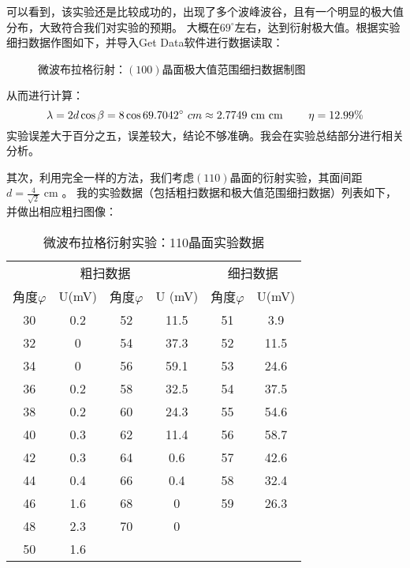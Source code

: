 \documentclass[11pt]{article}
\begin{document}
可以看到，该实验还是比较成功的，出现了多个波峰波谷，且有一个明显的极大值分布，大致符合我们对实验的预期。
大概在$69^{\circ}$左右，达到衍射极大值。根据实验细扫数据作图如下，并导入Get Data软件进行数据读取：

\begin{figure}[H]
    \centering
    \hspace{0.5cm}
    \caption{微波布拉格衍射：$(100)$晶面极大值范围细扫数据制图}
\end{figure}

从而进行计算：
\begin{displaymath}
    \lambda=2d\cos \beta=8\cos 69.7042^{\circ}\,\, cm \approx2.7749\,\, {\rm cm} \text{ cm }
\qquad \eta=12.99\%
\end{displaymath}
实验误差大于百分之五，误差较大，结论不够准确。我会在实验总结部分进行相关分析。

其次，利用完全一样的方法，我们考虑$(110)$晶面的衍射实验，其面间距$\displaystyle d=\frac{4}{\sqrt{2}}\text{ cm }$。
我的实验数据（包括粗扫数据和极大值范围细扫数据）列表如下，并做出相应粗扫图像：
\begin{table}[!ht]
    \centering
    \begin{tabular}{cccccc}
    \toprule
        \multicolumn{4}{c}{粗扫数据}  & \multicolumn{2}{c}{细扫数据}\\ 
        \cmidrule(lr){1-4}\cmidrule(lr){5-6}
        角度$\varphi$ & U(mV) & 角度$\varphi$ & U (mV)& 角度$\varphi$ & U(mV) \\ \midrule
        30 & 0.2 & 52 & 11.5 & 51 & 3.9 \\ 
        32 & 0 & 54 & 37.3 & 52 & 11.5 \\ 
        34 & 0 & 56 & 59.1 & 53 & 24.6 \\ 
        36 & 0.2 & 58 & 32.5 & 54 & 37.5 \\ 
        38 & 0.2 & 60 & 24.3 & 55 & 54.6 \\ 
        40 & 0.3 & 62 & 11.4 & 56 & 58.7 \\ 
        42 & 0.3 & 64 & 0.6 & 57 & 42.6 \\ 
        44 & 0.4 & 66 & 0.4 & 58 & 32.4 \\ 
        46 & 1.6 & 68 & 0 & 59 & 26.3 \\ 
        48 & 2.3 & 70 & 0 & ~ & ~ \\ 
        50 & 1.6 \\ 
        \bottomrule
    \end{tabular}
    \caption{微波布拉格衍射实验：110晶面实验数据}
\end{table}
\end{document}
